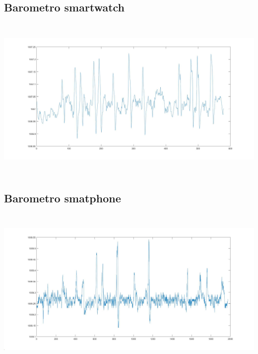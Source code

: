 \documentclass[a4paper, oneside]{book}
\begin{document}
\clearpage

\subsection{Barometro smartwatch\\} 
\begin{minipage}{\linewidth}
\begin{center}
\includegraphics[width=160mm, height= 80mm]{./images/registrazione_tesi/pressure_phone.jpg} 
\end{center}
\end{minipage}
\makebox[\linewidth]{}
\makebox[\linewidth]{}\makebox[\linewidth]{}\makebox[\linewidth]{}
\makebox[\linewidth]{}\makebox[\linewidth]{}\makebox[\linewidth]{}
\makebox[\linewidth]{}\makebox[\linewidth]{}\makebox[\linewidth]{}
\makebox[\linewidth]{}\makebox[\linewidth]{}\makebox[\linewidth]{}

\subsection{Barometro smatphone\\} 
\makebox[\linewidth]{}
\begin{minipage}{\linewidth}
\begin{center}
\includegraphics[width=160mm, height= 80mm]{./images/registrazione_tesi/pressure_watch.jpg} 
\end{center}
\end{minipage}
\end{document}
